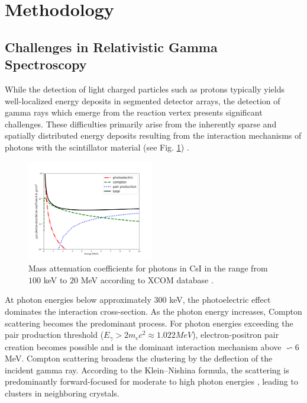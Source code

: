 \documentclass[final,5p,times,twocolumn]{elsarticle}
\begin{document}
\section{Methodology}
\label{sec:metho}
\subsection{Challenges in Relativistic Gamma Spectroscopy}\label{s_sec:gamma_spec}
While the detection of light charged particles such as protons typically yields well-localized energy deposits in segmented detector arrays, the detection of gamma rays which emerge from the reaction vertex presents significant challenges. These difficulties primarily arise from the inherently sparse and spatially distributed energy deposits resulting from the interaction mechanisms of photons with the scintillator material (see Fig. \ref{fig:csi}) \cite{kolanoski2016teilchendetektoren}.\newline
\begin{figure}[!htb]
	\centering 
	\includegraphics[width=0.49\textwidth]{csi_attuenuation.png}	
	\caption{Mass attenuation coefficients for photons in CsI in the range from $100$ keV to $20$ MeV according to XCOM database \cite{seltzer2010xcom}.} 
	\label{fig:csi}%
\end{figure}
At photon energies below approximately $300$ keV, the photoelectric effect dominates the interaction cross-section. As the photon energy increases, Compton scattering becomes the predominant process. For photon energies exceeding the pair production threshold ($E_{\gamma} > 2m_{e}c^2 \approx 1.022 MeV$), electron-positron pair creation becomes possible and is the dominant interaction mechanism above $\backsim 6$ MeV.\newline
Compton scattering broadens the clustering by the deflection of the incident gamma ray. According to the Klein–Nishina formula, the scattering is predominantly forward-focused for moderate to high photon energies \cite{klein1929streuung}, leading to clusters in neighboring crystals.\newline
\end{document}
